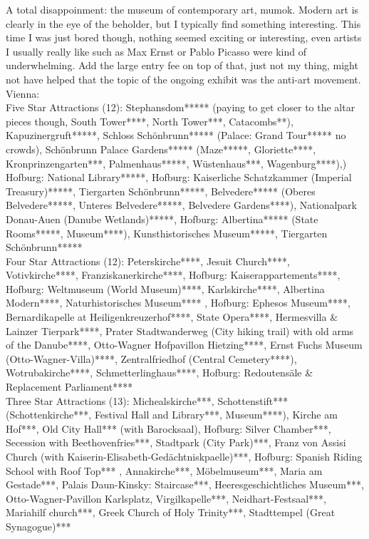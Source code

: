 A total disappoinment: the museum of contemporary art, mumok. Modern art is clearly in the eye of the beholder, but I typically find something interesting. This time I was just bored though, nothing seemed exciting or interesting, even artists I usually really like such as Max Ernst or Pablo Picasso were kind of underwhelming. Add the large entry fee on top of that, just not my thing, might not have helped that the topic of the ongoing exhibit was the anti-art movement.\\


Vienna: \\
Five Star Attractions (12): Stephansdom***** (paying to get closer to the altar pieces though, South Tower****, North Tower***, Catacombs**), Kapuzinergruft*****, Schloss Sch\"onbrunn***** (Palace: Grand Tour***** no crowds), Sch\"onbrunn Palace Gardens***** (Maze*****, Gloriette****, Kronprinzengarten***, Palmenhaus*****, W\"ustenhaus***, Wagenburg****),) Hofburg: National Library*****, Hofburg: Kaiserliche Schatzkammer (Imperial Treasury)*****, Tiergarten Sch\"onbrunn*****, Belvedere***** (Oberes Belvedere*****, Unteres Belvedere*****, Belvedere Gardens****), Nationalpark Donau-Auen (Danube Wetlands)*****, Hofburg: Albertina***** (State Rooms*****, Museum****),  Kunsthistorisches Museum*****, Tiergarten Sch\"onbrunn*****\\

Four Star Attractions (12): Peterskirche****, Jesuit Church****, Votivkirche****, Franziskanerkirche****, Hofburg: Kaiserappartements****, Hofburg: Weltmuseum (World Museum)****, Karlskirche****, Albertina Modern****, Naturhistorisches Museum**** , Hofburg: Ephesos Museum****, Bernardikapelle at Heiligenkreuzerhof****, State Opera****, Hermesvilla \& Lainzer Tierpark****, Prater Stadtwanderweg (City hiking trail) with old arms of the Danube****, Otto-Wagner Hofpavillon Hietzing****, Ernst Fuchs Museum (Otto-Wagner-Villa)****, Zentralfriedhof (Central Cemetery****), Wotrubakirche****, Schmetterlinghaus****, Hofburg: Redoutens\"ale \& Replacement Parliament****\\ 

Three Star Attractions (13):  Michealskirche***, Schottenstift*** (Schottenkirche***, Festival Hall and Library***, Museum****), Kirche am Hof***, Old City Hall*** (with Barocksaal), Hofburg: Silver Chamber***,  Secession with Beethovenfries***, Stadtpark (City Park)***, Franz von Assisi Church (with Kaiserin-Elisabeth-Ged\"achtniskpaelle)***, Hofburg: Spanish Riding School with Roof Top*** , Annakirche***, M\"obelmuseum***, Maria am Gestade***, Palais Daun-Kinsky: Staircase***, Heeresgeschichtliches Museum***, Otto-Wagner-Pavillon Karlsplatz, Virgilkapelle***, Neidhart-Festsaal***, Mariahilf church***, Greek Church of Holy Trinity***, Stadttempel (Great Synagogue)***\\

